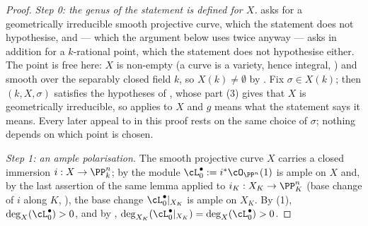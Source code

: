 \begin{proof}
\emph{Step 0: the genus of the statement is defined for $X$.}
 asks for a geometrically irreducible smooth
projective curve, which the statement does not hypothesise, and
 --- which the argument below uses twice
anyway --- asks in addition for a $k$-rational point, which the
statement does not hypothesise either.  The point is free here: $X$ is
non-empty (a curve is a variety, hence integral, )
and smooth over the separably closed field $k$, so
$X(k)\neq\emptyset$ by .  Fix
$\sigma\in X(k)$; then $(k,X,\sigma)$ satisfies the hypotheses of
, whose part (3) gives that $X$ is
geometrically irreducible, so  applies to $X$ and
$g$ means what the statement says it means.  Every later appeal to
 in this proof rests on the same choice of
$\sigma$; nothing depends on which point is chosen.

\emph{Step 1: an ample polarisation.}  The smooth projective curve $X$
carries a closed immersion $i:X\to\PP^n_k$; by 
the module $\cL_0^{\bullet}:=i^*\cO_{\PP^n}(1)$ is ample on $X$ and, by
the last assertion of the same lemma applied to
$i_K:X_K\to\PP^n_K$ (base change of $i$ along $K$, ),
the base change $\cL_0^{\bullet}|_{X_K}$ is ample on $X_K$.
By (1), $\deg_X(\cL_0^{\bullet})>0$, and
by ,
$\deg_{X_K}(\cL_0^{\bullet}|_{X_K})=\deg_X(\cL_0^{\bullet})>0$.


\end{proof}
